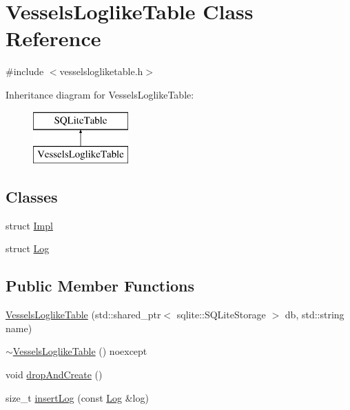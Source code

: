 \hypertarget{class_vessels_loglike_table}{}\section{Vessels\+Loglike\+Table Class Reference}
\label{class_vessels_loglike_table}


{\ttfamily \#include $<$vesselslogliketable.\+h$>$}

Inheritance diagram for Vessels\+Loglike\+Table\+:\begin{figure}[H]
\begin{center}
\leavevmode
\includegraphics[height=2.000000cm]{dd/d05/class_vessels_loglike_table}
\end{center}
\end{figure}
\subsection*{Classes}
\begin{DoxyCompactItemize}
\item 
struct \mbox{\hyperlink{struct_vessels_loglike_table_1_1_impl}{Impl}}
\item 
struct \mbox{\hyperlink{struct_vessels_loglike_table_1_1_log}{Log}}
\end{DoxyCompactItemize}
\subsection*{Public Member Functions}
\begin{DoxyCompactItemize}
\item 
\mbox{\hyperlink{class_vessels_loglike_table_a5c3778438ddc9c0a466a64d98dc429cf}{Vessels\+Loglike\+Table}} (std\+::shared\+\_\+ptr$<$ sqlite\+::\+S\+Q\+Lite\+Storage $>$ db, std\+::string name)
\item 
\mbox{\hyperlink{class_vessels_loglike_table_afce647d49f4d3f47362753cd72cc87b3}{$\sim$\+Vessels\+Loglike\+Table}} () noexcept
\item 
void \mbox{\hyperlink{class_vessels_loglike_table_a25d6a2791d3a018ad4630e9bb90322cb}{drop\+And\+Create}} ()
\item 
size\+\_\+t \mbox{\hyperlink{class_vessels_loglike_table_a89d031eef1f09b54e64b1f09db0ce1d5}{insert\+Log}} (const \mbox{\hyperlink{struct_vessels_loglike_table_1_1_log}{Log}} \&log)
\end{DoxyCompactItemize}
